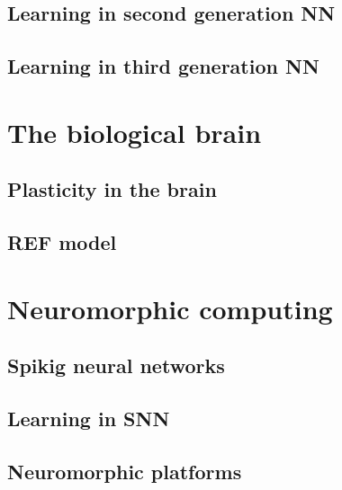 \documentclass[report.tex]{subfiles}
\begin{document}
\subsection{Learning in second generation \gls{NN}}
\subsection{Learning in third generation \gls{NN}}



\section{The biological brain}
\subsection{Plasticity in the brain}
\subsection{REF model} \label{sec:ref}

\section{Neuromorphic computing}
\subsection{Spikig neural networks} \label{sec:SNN}
\subsection{Learning in SNN}
\subsection{Neuromorphic platforms}
\end{document}
